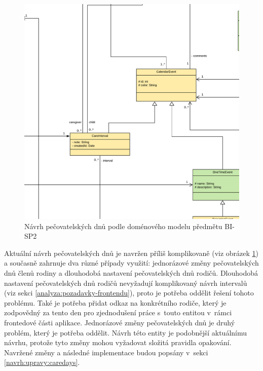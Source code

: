         \begin{figure}\centering
            \includegraphics[width=1.0\textwidth]{pdfs/CareDays1}
            \caption[Předešlý návrh pečovatelských dnů]{Návrh pečovatelských dnů podle doménového modelu předmětu BI-SP2}\label{image:caredays1}
        \end{figure}
        Aktuální návrh pečovatelských dnů je navržen příliš komplikovaně (viz obrázek \ref{image:caredays1}) a současně zahrnuje dva různé případy využití: jednorázové změny pečovatelských dnů členů rodiny a dlouhodobá nastavení pečovatelských dnů rodičů. Dlouhodobá nastavení pečovatelských dnů rodičů nevyžadují komplikovaný návrh intervalů (viz sekci \ref{analyza:pozadavky-frontendu}), proto je potřeba oddělit řešení tohoto problému. Také je potřeba přidat odkaz na konkrétního rodiče, který je zodpovědný za tento den pro zjednodušení práce s~touto entitou v~rámci frontedové části aplikace. Jednorázové změny pečovatelských dnů je druhý problém, který je potřeba oddělit. Návrh této entity je podobnější aktuálnímu návrhu, protože tyto změny mohou vyžadovat složitá pravidla opakování. Navržené změny a následné implementace budou popsány v~sekci \ref{navrh:upravy:caredays}.
        

